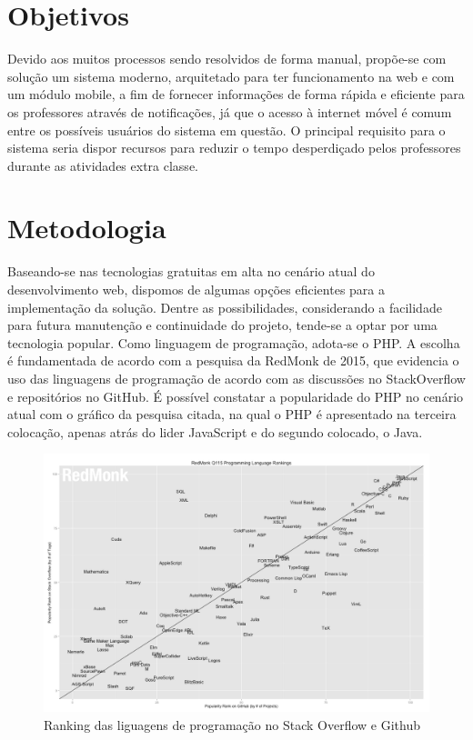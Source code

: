\section{Objetivos} %


Devido aos muitos processos sendo resolvidos de forma manual, propõe-se com solução um sistema moderno, arquitetado para ter funcionamento na web e com um módulo mobile, a fim de fornecer informações de forma rápida e eficiente para os professores através de notificações, já que o acesso à internet móvel é comum entre os possíveis usuários do sistema em questão.
O principal requisito para o sistema seria dispor recursos para reduzir o tempo desperdiçado pelos professores durante as atividades extra classe.


\section{Metodologia} %


Baseando-se nas tecnologias gratuitas em alta no cenário atual do desenvolvimento web, dispomos de algumas opções eficientes para a implementação da solução. Dentre as possibilidades, considerando a facilidade para futura manutenção e continuidade do projeto, tende-se a optar por uma tecnologia popular. Como linguagem de programação, adota-se o PHP. A escolha é fundamentada de acordo com a pesquisa da RedMonk de 2015, que evidencia o uso das linguagens de programação de acordo com as discussões no StackOverflow e repositórios no GitHub. É possível constatar a popularidade do PHP no cenário atual com o gráfico da pesquisa citada, na qual o PHP é apresentado na terceira colocação, apenas atrás do lider JavaScript e do segundo colocado, o Java.

\begin{figure}
	\label{fig:graficoRedmonk}
	\includegraphics[width=1\textwidth]{img/grafico_redmonk}
	\caption{Ranking das liguagens de programação no Stack Overflow e Github}
\end{figure}


